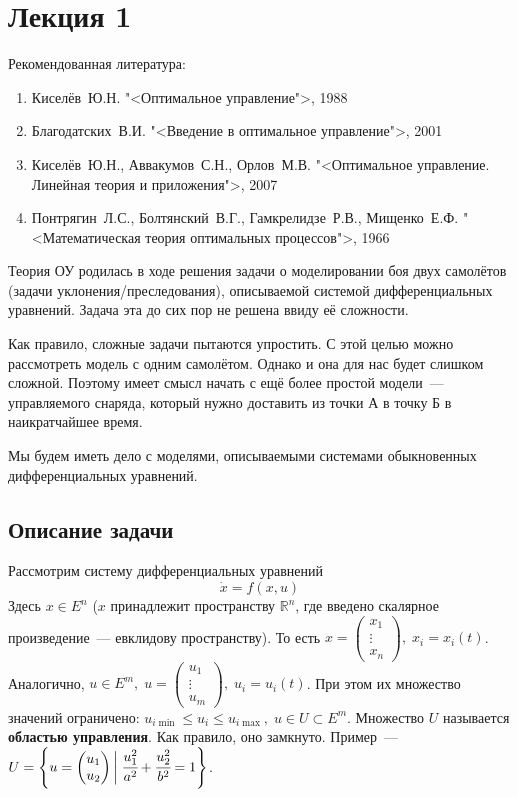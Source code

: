 \section{Лекция 1}

Рекомендованная литература:
\begin{enumerate}
    \item Киселёв~Ю.Н. "<Оптимальное управление">, 1988
    \item Благодатских~В.И. "<Введение в оптимальное управление">, 2001
    \item Киселёв~Ю.Н., Аввакумов~С.Н., Орлов~М.В. "<Оптимальное управление. Линейная теория и приложения">, 2007 %
    \item Понтрягин~Л.С., Болтянский~В.Г., Гамкрелидзе~Р.В., Мищенко~Е.Ф. "<Математическая теория оптимальных процессов">, 1966
\end{enumerate}

Теория ОУ родилась в ходе решения задачи о моделировании боя двух самолётов (задачи уклонения/преследования), описываемой системой дифференциальных уравнений.
Задача эта до сих пор не решена ввиду её сложности.

Как правило, сложные задачи пытаются упростить.
С этой целью можно рассмотреть модель с одним самолётом. 
Однако и она для нас будет слишком сложной.
Поэтому имеет смысл начать с ещё более простой модели~--- управляемого снаряда, который нужно доставить из точки А в точку Б в наикратчайшее время.

Мы будем иметь дело с моделями, описываемыми системами обыкновенных дифференциальных уравнений.

\subsection{Описание задачи}

Рассмотрим систему дифференциальных уравнений
\begin{equation}
    \dot{x} = f(x, u)
\end{equation}
Здесь $x \in E^n $ ($x$ принадлежит пространству $\mathbb{R}^n$, где введено скалярное произведение~--- евклидову пространству).
То есть $x = \left( \begin{matrix}
    x_1 \\
    \vdots \\
    x_n 
\end{matrix} \right), \; x_i = x_i(t)$.
Аналогично, $u \in E^m, \; u = \left( \begin{matrix}
    u_1 \\
    \vdots \\
    u_m 
\end{matrix} \right), \; u_i = u_i(t)$. 
При этом их множество значений ограничено: $u_{i \min} \leqslant u_i \leqslant u_{i \max}, \; u \in U \subset E^m$.
Множество $U$ называется \textbf{областью управления}. 
Как правило, оно замкнуто.
Пример~--- $U = \left\{u = \left(\begin{matrix}
    u_1 \\
    u_2
\end{matrix}\right)\biggl| \; \cfrac{u_1^2}{a^2} + \cfrac{u_2^2}{b^2} = 1\right\}$.

